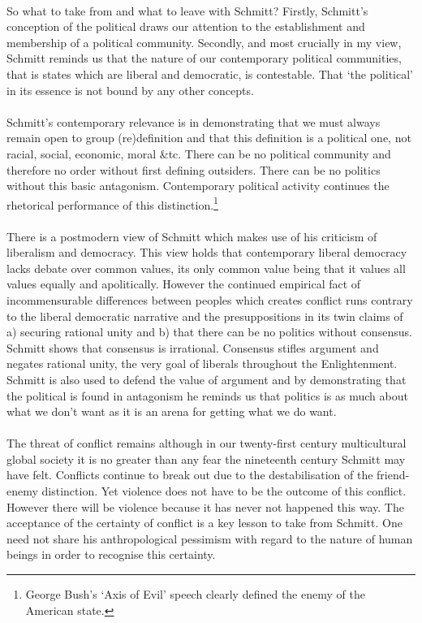\documentclass[12pt,a4paper,titlepage]{article}
\begin{document}
\paragraph{}So what to take from and what to leave with Schmitt? Firstly, Schmitt's conception of the political draws our attention to the establishment and membership of a political community. Secondly, and most crucially in my view, Schmitt reminds us that the nature of our contemporary political communities, that is states which are liberal and democratic, is contestable. That `the political' in its essence is not bound by any other concepts.

\paragraph{}Schmitt's contemporary relevance is in demonstrating that we must always remain open to group (re)definition and that this definition is a political one, not racial, social, economic, moral \&tc. There can be no political community and therefore no order without first defining outsiders. There can be no politics without this basic antagonism. Contemporary political activity continues the rhetorical performance of this distinction.\footnote{George Bush's `Axis of Evil' speech clearly defined the enemy of the American state.}

\paragraph{}There is a postmodern view of Schmitt which makes use of his criticism of liberalism and democracy. This view holds that contemporary liberal democracy lacks debate over common values, its only common value being that it values all values equally and apolitically. However the continued empirical fact of incommensurable differences between peoples which creates conflict runs contrary to the liberal democratic narrative and the presuppositions in its twin claims of a) securing rational unity and b) that there can be no politics without consensus. Schmitt shows that consensus is irrational. Consensus stifles argument and negates rational unity, the very goal of liberals throughout the Enlightenment. Schmitt is also used to defend the value of argument and by demonstrating that the political is found in antagonism he reminds us that politics is as much about what we don't want as it is an arena for getting what we do want.

\paragraph{}The threat of conflict remains although in our twenty-first century multicultural global society it is no greater than any fear the nineteenth century Schmitt may have felt. Conflicts continue to break out due to the destabilisation of the friend-enemy distinction. Yet violence does not have to be the outcome of this conflict. However there will be violence because it has never not happened this way. The acceptance of the certainty of conflict is a key lesson to take from Schmitt. One need not share his anthropological pessimism with regard to the nature of human beings in order to recognise this certainty.
\end{document}
